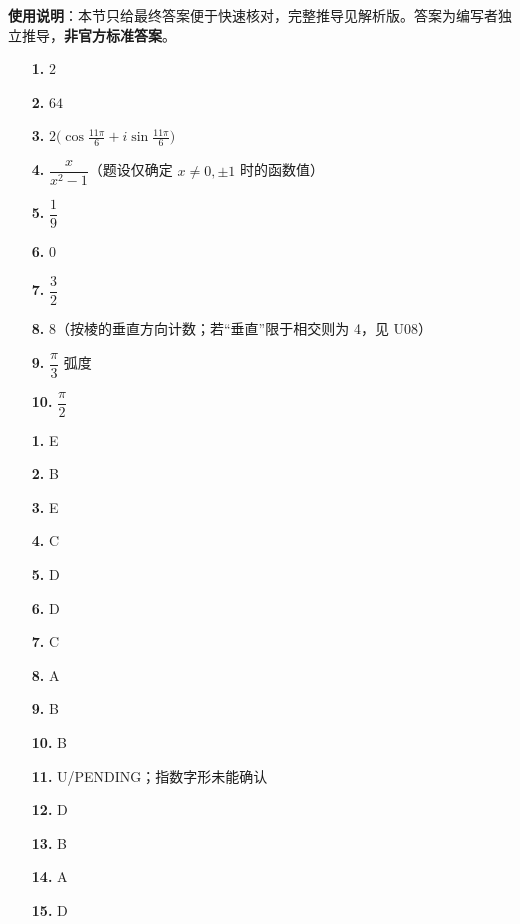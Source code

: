 
\begin{gknotice}
\textbf{使用说明}：本节只给最终答案便于快速核对，完整推导见解析版。答案为编写者独立推导，\textbf{非官方标准答案}。
\end{gknotice}

\begin{itemize}[leftmargin=2.6em]
  \item[\textbf{1.}] $2$
  \item[\textbf{2.}] $64$
  \item[\textbf{3.}] $2\bigl(\cos\frac{11\pi}{6}+i\sin\frac{11\pi}{6}\bigr)$
  \item[\textbf{4.}] $\dfrac{x}{x^2-1}$（题设仅确定 $x\ne0,\pm1$ 时的函数值）
  \item[\textbf{5.}] $\dfrac19$
  \item[\textbf{6.}] $0$
  \item[\textbf{7.}] $\dfrac32$
  \item[\textbf{8.}] $8$（按棱的垂直方向计数；若“垂直”限于相交则为 4，见 U08）
  \item[\textbf{9.}] $\dfrac\pi3$ 弧度
  \item[\textbf{10.}] $\dfrac\pi2$
\end{itemize}

\begin{itemize}[leftmargin=2.6em]
  \item[\textbf{1.}] E
  \item[\textbf{2.}] B
  \item[\textbf{3.}] E
  \item[\textbf{4.}] C
  \item[\textbf{5.}] D
  \item[\textbf{6.}] D
  \item[\textbf{7.}] C
  \item[\textbf{8.}] A
  \item[\textbf{9.}] B
  \item[\textbf{10.}] B
  \item[\textbf{11.}] U/PENDING；指数字形未能确认
  \item[\textbf{12.}] D
  \item[\textbf{13.}] B
  \item[\textbf{14.}] A
  \item[\textbf{15.}] D
\end{itemize}

